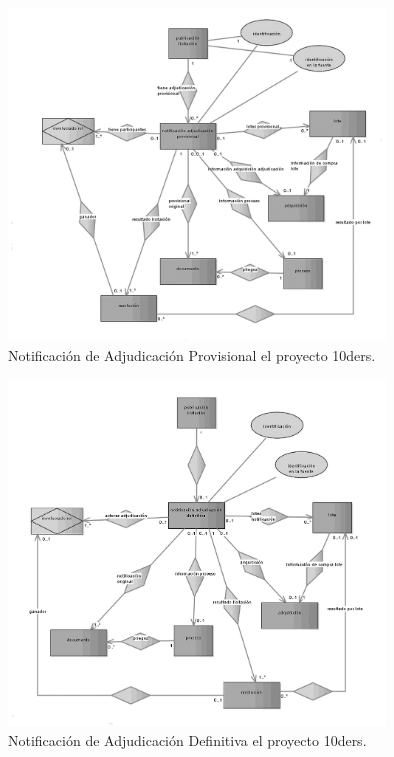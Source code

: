 \begin{figure}[!htb]
\centering
	\includegraphics[width=10cm]{images/phd/eproc/10ders-4}
\caption{Notificación de Adjudicación Provisional el proyecto 10ders.}
\label{fig:10ders-4}
\end{figure}



\begin{figure}[!htb]
\centering
	\includegraphics[width=10cm]{images/phd/eproc/10ders-5}
\caption{Notificación de Adjudicación Definitiva el proyecto 10ders.}
\label{fig:10ders-5}
\end{figure}



